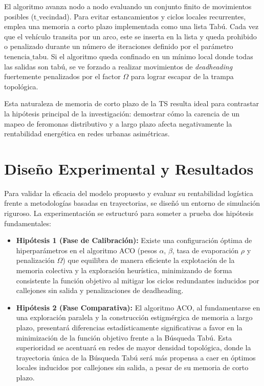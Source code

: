 \documentclass[conference]{IEEEtran}
\begin{document}
El algoritmo avanza nodo a nodo evaluando un conjunto finito de movimientos posibles ($\text{t\_vecindad}$). Para evitar estancamientos y ciclos locales recurrentes, emplea una memoria a corto plazo implementada como una lista Tabú. Cada vez que el vehículo transita por un arco, este se inserta en la lista y queda prohibido o penalizado durante un número de iteraciones definido por el parámetro $\text{tenencia\_tabu}$. Si el algoritmo queda confinado en un mínimo local donde todas las salidas son tabú, se ve forzado a realizar movimientos de \textit{deadheading} fuertemente penalizados por el factor $\Omega$ para lograr escapar de la trampa topológica.

Esta naturaleza de memoria de corto plazo de la TS resulta ideal para contrastar la hipótesis principal de la investigación: demostrar cómo la carencia de un mapeo de feromonas distributivo y a largo plazo afecta negativamente la rentabilidad energética en redes urbanas asimétricas.

\section{Diseño Experimental y Resultados}
Para validar la eficacia del modelo propuesto y evaluar su rentabilidad logística frente a metodologías basadas en trayectorias, se diseñó un entorno de simulación riguroso. La experimentación se estructuró para someter a prueba dos hipótesis fundamentales:

\begin{itemize}
    \item \textbf{Hipótesis 1 (Fase de Calibración):} Existe una configuración óptima de hiperparámetros en el algoritmo ACO (pesos $\alpha$, $\beta$, tasa de evaporación $\rho$ y penalización $\Omega$) que equilibra de manera eficiente la explotación de la memoria colectiva y la exploración heurística, minimizando de forma consistente la función objetivo al mitigar los ciclos redundantes inducidos por callejones sin salida y penalizaciones de deadheading.
    \item \textbf{Hipótesis 2 (Fase Comparativa):} El algoritmo ACO, al fundamentarse en una exploración paralela y la construcción estigmérgica de memoria a largo plazo, presentará diferencias estadísticamente significativas a favor en la minimización de la función objetivo frente a la Búsqueda Tabú. Esta superioridad se acentuará en redes de mayor densidad topológica, donde la trayectoria única de la Búsqueda Tabú será más propensa a caer en óptimos locales inducidos por callejones sin salida, a pesar de su memoria de corto plazo.
\end{itemize}
\end{document}
